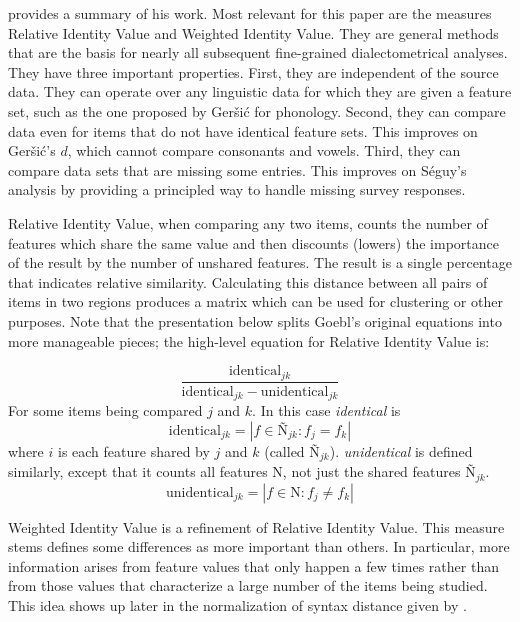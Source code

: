 \documentclass[11pt]{article}
\begin{document}
 provides a summary of his work. Most relevant for
this paper are the measures Relative Identity Value and Weighted
Identity Value. They are general methods that are the basis for nearly
all subsequent fine-grained dialectometrical analyses. They have three
important properties. First, they are independent of the source
data. They can operate over any linguistic data for which they are
given a feature set, such as the one proposed by Ger\v{s}i\'c for
phonology. Second, they can compare data even for items that do not
have identical feature sets. This improves on Ger\v{s}i\'c's $d$,
which cannot compare consonants and vowels. Third, they can compare
data sets that are missing some entries. This improves on S\'eguy's
analysis by providing a principled way to handle missing survey
responses.

Relative Identity Value, when comparing any two items, counts the
number of features which share the same value and then discounts
(lowers) the importance of the result by the number of unshared
features. The result is a single percentage that indicates
relative similarity. Calculating this distance between all pairs
of items in two regions produces a matrix which can be used for
clustering or other purposes. Note that the presentation below splits
Goebl's original equations into more manageable pieces; the high-level
equation for Relative Identity Value is:

\begin{equation}
  \frac{\textrm{identical}_{jk}} {\textrm{identical}_{jk} - \textrm{unidentical}_{jk}}
\label{riv}
\end{equation}
For some items being compared $j$ and $k$. In this case
\textit{identical} is
\begin{equation}
  \textrm{identical}_{jk} = |f \in \textrm{\~N}_{jk} : f_j = f_k|
\end{equation}
where $i$ is each feature shared by $j$ and $k$ (called
$\textrm{\~N}_{jk}$). \textit{unidentical} is defined similarly, except
that it counts all features N, not just the shared features
$\textrm{\~N}_{jk}$.
\begin{equation}
  \textrm{unidentical}_{jk} = |f \in \textrm{N} : f_j \neq f_k|
\end{equation}

Weighted Identity Value is a refinement of Relative Identity
Value. This measure stems defines some differences as more
important than others. In particular, more information arises from
feature values that only happen a few times rather than from those values
that characterize a large number of the items being studied.  This
idea shows up later in the normalization of syntax distance given by
.
\end{document}
